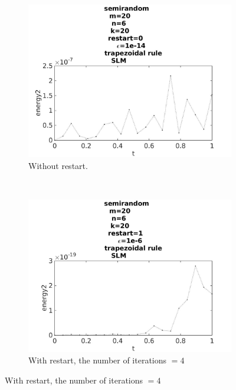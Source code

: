 \begin{figure}[H]
        \centering
        \begin{subfigure}[b]{0.3\textwidth}
                \includegraphics[width=\textwidth]{../MATLAB/fig/energytestrestart02.jpg}
                \caption{ Without restart. }
                \label{fig:energytestrestart02}
        \end{subfigure}
        ~
        \begin{subfigure}[b]{0.3\textwidth}
                \includegraphics[width=\textwidth]{../MATLAB/fig/energytestrestart22.jpg}
                \caption{ With restart, the number of iterations $= 4$ }
                \label{fig:energytestrestart22}
        \end{subfigure}

\end{figure}
